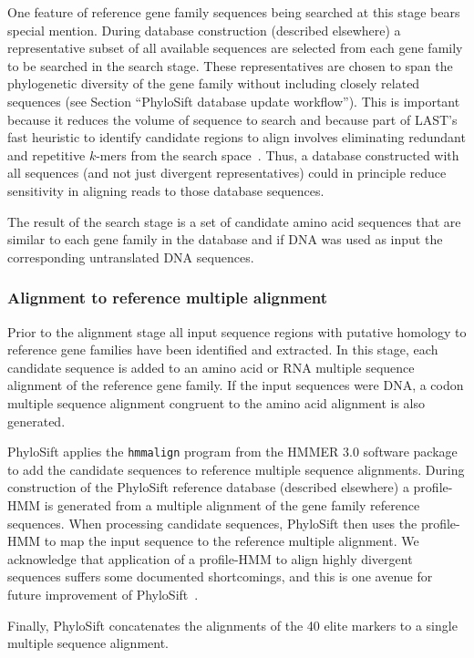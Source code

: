\documentclass[10pt]{article}
\begin{document}
One feature of reference gene family sequences being searched at this stage bears special mention.
During database construction (described elsewhere) a representative subset of all available sequences are selected from each gene family to be searched in the search stage.
These representatives are chosen to span the phylogenetic diversity of the gene family without including closely related sequences (see Section ``PhyloSift database update workflow'').
This is important because it reduces the volume of sequence to search and because part of LAST's fast heuristic to identify candidate regions to align involves eliminating redundant and repetitive $k$-mers from the search space~\cite{Kiełbasa2011}.
Thus, a database constructed with all sequences (and not just divergent representatives) could in principle reduce sensitivity in aligning reads to those database sequences.

The result of the search stage is a set of candidate amino acid sequences that are similar to each gene family in the database and if {DNA} was used as input the corresponding untranslated {DNA} sequences.

\subsubsection*{Alignment to reference multiple alignment}
Prior to the alignment stage all input sequence regions with putative homology to reference gene families have been identified and extracted.
In this stage, each candidate sequence is added to an amino acid or {RNA} multiple sequence alignment of the reference gene family.
If the input sequences were {DNA}, a codon multiple sequence alignment congruent to the amino acid alignment is also generated.

PhyloSift applies the \texttt{hmmalign} program from the HMMER 3.0 software package~\cite{Eddy2011} to add the candidate sequences to reference multiple sequence alignments.
During construction of the PhyloSift reference database (described elsewhere) a profile-HMM is generated from a multiple alignment of the gene family reference sequences.
When processing candidate sequences, PhyloSift then uses the profile-HMM to map the input sequence to the reference multiple alignment.
We acknowledge that application of a profile-HMM to align highly divergent sequences suffers some documented shortcomings, and this is one avenue for future improvement of PhyloSift~\cite{Loytynoja2012}.

Finally, PhyloSift concatenates the alignments of the 40 elite markers to a single multiple sequence alignment.
\end{document}
